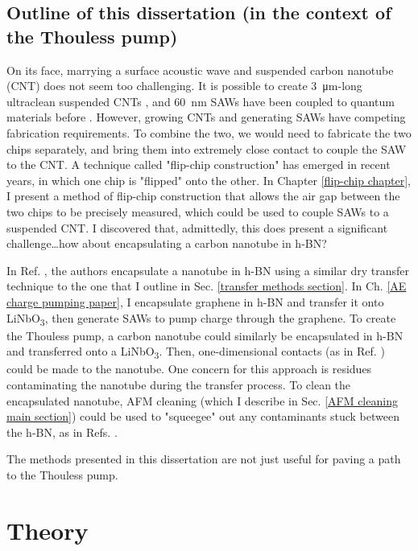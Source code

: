 \documentclass[double,12pt,1in]{beavtex}
\begin{document}
\section{Outline of this dissertation (in the context of the Thouless pump)}
On its face, marrying a surface acoustic wave and suspended carbon nanotube (CNT) does not seem too challenging. It is possible to create \SI{3}{\micro\meter}-long ultraclean suspended CNTs \cite{senger_universal_2018}, and \SI{60}{\nano\meter} SAWs have been coupled to quantum materials before \cite{kukushkin_collective_2011}. However, growing CNTs and generating SAWs have competing fabrication requirements. To combine the two, we would need to fabricate the two chips separately, and bring them into extremely close contact to couple the SAW to the CNT. A technique called "flip-chip construction" has emerged in recent years, in which one chip is "flipped" onto the other. In Chapter \ref{flip-chip chapter}, I present a method of flip-chip construction that allows the air gap between the two chips to be precisely measured, which could be used to couple SAWs to a suspended CNT. I discovered that, admittedly, this does present a significant challenge\dots how about encapsulating a carbon nanotube in h-BN?

In Ref. \cite{huang_superior_2015}, the authors encapsulate a nanotube in h-BN using a similar dry transfer technique to the one that I outline in Sec. \ref{transfer methods section}. In Ch. \ref{AE charge pumping paper}, I encapsulate graphene in h-BN and transfer it onto LiNbO\textsubscript{3}, then generate SAWs to pump charge through the graphene. To create the Thouless pump, a carbon nanotube could similarly be encapsulated in h-BN and transferred onto a LiNbO\textsubscript{3}. Then, one-dimensional contacts (as in Ref. \cite{huang_superior_2015}) could be made to the nanotube. One concern for this approach is residues contaminating the nanotube during the transfer process. To clean the encapsulated nanotube, AFM cleaning (which I describe in Sec. \ref{AFM cleaning main section}) could be used to "squeegee" out any contaminants stuck between the h-BN, as in Refs. \cite{goossens_mechanical_2012,chen_tip-based_2021}. 

The methods presented in this dissertation are not just useful for paving a path to the Thouless pump. 



\chapter{Theory}
\end{document}
